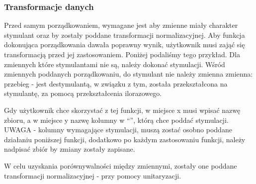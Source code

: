 \documentclass[12pt,a4paper]{report}
\begin{document}
{\subsubsection{Transformacje danych}\label{transformacje-danych}

Przed samym porządkowaniem, wymagane jest aby zmienne miały charakter
stymulant oraz by zostały poddane transformacji normalizacyjnej. Aby
funkcja dokonująca porządkowania dawała poprawny wynik, użytkownik musi
zająć się transformacją przed jej zastosowaniem. Poniżej podaliśmy tego
przykład. Dla zmiennych które stymulantami nie są, należy dokonać
stymulacji. Wśród zmiennych poddanych porządkowaniu, do stymulant
nie należy zmienna zmienna: przebieg - jest destymulantą, w związku z
tym, została przekształcona na stymulantę, za pomocą przekształcenia
ilorazowego.

\begin{Shaded}
\begin{Highlighting}[]
  \NormalTok{:}
    \NormalTok{x[i,}\NormalTok{(}\NormalTok{(x)==y)]=}\NormalTok{/x[i,}\NormalTok{(}\NormalTok{(x)==y)]}
  \NormalTok{\}}
\NormalTok{\}}
\end{Highlighting}
\end{Shaded}

Gdy użytkownik chce skorzystać z tej funkcji, w miejsce x musi wpisać
nazwę zbioru, a w miejsce y nazwę kolumny w ``'', którą chce poddać
stymulacji. UWAGA - kolumny wymagające stymulacji, muszą zostać osobno
poddane działaniu poniższej funkcji, dodatkowo po każdym zastosowaniu
funkcji, należy nadpisać zbiór by zmiany zostały zapisane.

\begin{Shaded}
\begin{Highlighting}[]
\NormalTok{)}
\end{Highlighting}
\end{Shaded}

W celu uzyskania porównywalności między zmiennymi, zostały one poddane
transformacji normalizacyjnej - przy pomocy unitaryzacji.

\begin{Shaded}
\begin{Highlighting}[]
  \NormalTok{:}
    \NormalTok{:}
    \NormalTok{\}}
  \NormalTok{\}}
\NormalTok{\}}


\end{Highlighting}
\end{Shaded}}
\end{document}
